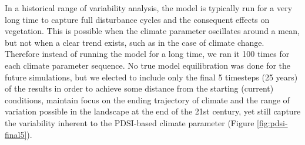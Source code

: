 In a historical range of variability analysis, the model is typically run for a very long time to capture full disturbance cycles and the consequent effects on vegetation. This is possible when the climate parameter oscillates around a mean, but not when a clear trend exists, such as in the case of climate change. Therefore instead of running the model for a long time, we ran it 100 times for each climate parameter sequence. No true model equilibration was done for the future simulations, but we elected to include only the final 5 timesteps (25 years) of the results in order to achieve some distance from the starting (current) conditions, maintain focus on the ending trajectory of climate and the range of variation possible in the landscape at the end of the 21st century, yet still capture the variability inherent to the PDSI-based climate parameter (Figure \ref{fig:pdsi-final5}).





